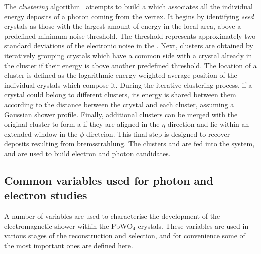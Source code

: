 The \emph{clustering} algorithm~\cite{CMS-PAS-EGM-13-001,CMS-PAS-EGM-14-001} attempts to build a \SC which associates all the individual energy deposits of a photon coming from the vertex. It begins by identifying \emph{seed} crystals as those with the largest amount of energy in the local area, above a predefined minimum noise threshold. The threshold %
represents approximately two standard deviations of the electronic noise in the \ECAL. Next, clusters are obtained by iteratively grouping crystals which have a common side with a crystal already in the cluster if their energy is above another predefined threshold. The location of a cluster is defined as the logarithmic energy-weighted average position of the individual crystals which compose it. During the iterative clustering process, if a crystal could belong to different clusters, its energy is shared between them according to the distance between the crystal and each cluster, assuming a Gaussian shower profile. Finally, additional clusters can be merged with the original cluster to form a \SC if they are aligned in the $\eta$-direction and lie within an extended window in the $\phi$-diretcion. This final step is designed to recover deposits resulting from bremsstrahlung.
The clusters and \SC\s are fed into the \PF system, and are used to build electron and photon candidates.

\subsection{Common variables used for photon and electron studies}
\label{sec:reco:photon:showershapes}

A number of variables are used to characterise the development of the electromagnetic shower within the PbWO$_4$ crystals. These variables are used in various stages of the reconstruction and selection, and for convenience some of the most important ones are defined here.
%


